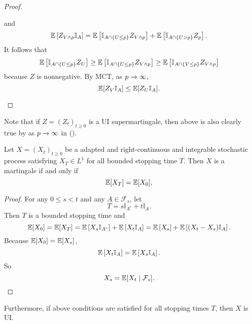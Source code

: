 \begin{proof}
\begin{enumerate}[label=(\roman*)]
\begin{equation*}
        \end{equation*}
        and
        \begin{equation*}
            \mathbb{E}\left[Z_{V \wedge p}\mathbb{I}_A\right] = \mathbb{E}\left[\mathbb{I}_{A\cap \left\{U \leq p\right\}}Z_{V \wedge p}\right] + \mathbb{E}\left[\mathbb{I}_{A\cap \left\{U > p\right\}}Z_p\right].
        \end{equation*}
        It follows that
        \begin{equation*}
            \mathbb{E}\left[\mathbb{I}_{A\cap \left\{U \leq p\right\}}Z_U\right] \geq \mathbb{E}\left[\mathbb{I}_{A\cap \left\{U \leq p\right\}}Z_{V \wedge p}\right] \geq \mathbb{E}\left[\mathbb{I}_{A\cap \left\{V \leq p\right\}}Z_{V \wedge p}\right] 
        \end{equation*}
        because $Z$ is nonnegative. By MCT, as $p \rightarrow \infty$,
        \begin{equation*}
            \mathbb{E}[Z_V \mathbb{I}_A] \leq \mathbb{E}[Z_U\mathbb{I}_A]. \qedhere
        \end{equation*}
    \end{enumerate}
\end{proof}
\begin{rmk}
    Note that if $Z = (Z_t)_{t \geq 0}$ is a UI supermartingale, then above is also clearly true by as $p \rightarrow \infty$ in ().
\end{rmk}

\begin{prop}
    Let $X=(X_t)_{t \geq 0}$ be a adapted and right-continuous and integrable stochastic process satisfying $X_T \in L^1$ for all bounded stopping time $T$. Then $X$ is a martingale if and only if
    \begin{equation*}
        \mathbb{E}[X_T] = \mathbb{E}[X_0],
    \end{equation*}
\end{prop}
\begin{proof}
    For any $0 \leq s < t$ and any $A \in \mathcal{F}_s$, let
    \begin{equation*}
        T = s \mathbb{I}_{A^c} + t \mathbb{I}_{A}.
    \end{equation*}
    Then $T$ is a bounded stopping time and
    \begin{equation*}
        \mathbb{E}[X_0] = \mathbb{E}[X_T] = \mathbb{E}\left[X_s \mathbb{I}_{A^c}\right] + \mathbb{E}\left[X_t \mathbb{I}_{A}\right] = \mathbb{E}\left[X_s\right]+\mathbb{E}\left[(X_t - X_s) \mathbb{I}_{A}\right].
    \end{equation*}
    Because $\mathbb{E}[X_0] = \mathbb{E}[X_s]$,
    \begin{equation*}
        \mathbb{E}\left[X_t \mathbb{I}_{A}\right] = \mathbb{E}\left[X_s \mathbb{I}_{A}\right]. 
    \end{equation*}
    So
    \begin{equation*}
        X_s = \mathbb{E}[X_t \mid \mathcal{F}_s]. \qedhere
    \end{equation*}
\end{proof}
\begin{rmk}
    Furthermore, if above conditions are satisfied for all stopping times $T$, then $X$ is UI.
\end{rmk}

